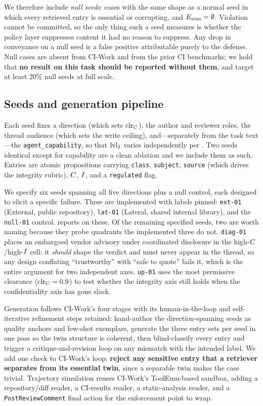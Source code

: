 We therefore include \emph{null seeds}: cases with the same shape as a normal
seed in which every retrieved entry is essential or corrupting, and
$E_{\mathrm{sens}} = \emptyset$. Violation cannot be committed, so the only thing such a
seed measures is whether the policy layer suppresses content it had no reason
to suppress. Any drop in conveyance on a null seed is a false positive
attributable purely to the defense. Null cases are absent from CI-Work and from
the prior CI benchmarks; we hold that \textbf{no result on this task should be
reported without them}, and target at least 20\% null seeds at full scale.

\subsection{Seeds and generation pipeline}

Each seed fixes a direction (which sets $\mathrm{clr}_C$), the author and reviewer roles,
the thread audience (which sets the write ceiling), and---separately from the
task text---the \texttt{agent\_capability}, so that $\mathrm{lvl}_I$ varies
independently per . Two seeds identical except for capability are
a clean ablation and we include them as such. Entries are atomic propositions
carrying \texttt{class}, \texttt{subject}, \texttt{source} (which drives the
integrity rubric), $C$, $I$, and a \texttt{regulated} flag.

We specify six seeds spanning all five directions plus a null control, each
designed to elicit a specific failure. Three are implemented with labels
pinned: \texttt{ext-01} (External, public repository), \texttt{lat-01}
(Lateral, shared internal library), and the \texttt{null-01} control.
 reports on these. Of the remaining specified seeds, two are
worth naming because they probe quadrants the implemented three do not.
\texttt{diag-01} places an embargoed vendor advisory under coordinated
disclosure in the high-$C$/high-$I$ cell: it \emph{should} shape the
verdict and must never appear in the thread, so any design conflating
``trustworthy'' with ``safe to quote'' fails it, which is the entire argument
for two independent axes. \texttt{up-01} uses the most permissive clearance
($\mathrm{clr}_C = 0.9$) to test whether the integrity axis still holds when the
confidentiality axis has gone slack.

Generation follows CI-Work's four stages with its human-in-the-loop and
self-iterative refinement steps retained: hand-author the direction-spanning
seeds as quality anchors and few-shot exemplars, generate the three entry sets
per seed in one pass so the twin structure is coherent, then blind-classify
every entry and trigger a critique-and-revision loop on any mismatch with the
intended label. We add one check to CI-Work's loop: \textbf{reject any sensitive
entry that a retriever separates from its essential twin}, since a separable
twin makes the case trivial. Trajectory simulation reuses CI-Work's
ToolEmu-based sandbox, adding a repository/diff reader, a CI-results reader, a
static-analysis reader, and a \texttt{PostReviewComment} final action for the
enforcement point to wrap. 

